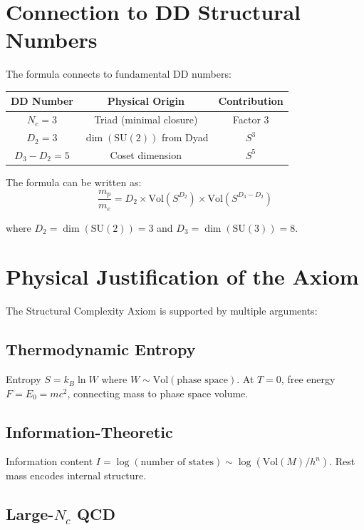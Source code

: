 \section{Connection to DD Structural Numbers}

The formula connects to fundamental DD numbers:

\begin{center}
\begin{tabular}{ccc}
\hline
DD Number & Physical Origin & Contribution \\
\hline
$N_c = 3$ & Triad (minimal closure) & Factor 3 \\
$D_2 = 3$ & $\dim(\text{SU}(2))$ from Dyad & $S^3$ \\
$D_3 - D_2 = 5$ & Coset dimension & $S^5$ \\
\hline
\end{tabular}
\end{center}

The formula can be written as:
\begin{equation}
\frac{m_p}{m_e} = D_2 \times \text{Vol}(S^{D_2}) \times \text{Vol}(S^{D_3 - D_2})
\end{equation}

where $D_2 = \dim(\text{SU}(2)) = 3$ and $D_3 = \dim(\text{SU}(3)) = 8$.

\section{Physical Justification of the Axiom}

The Structural Complexity Axiom is supported by multiple arguments:

\subsection{Thermodynamic Entropy}

Entropy $S = k_B \ln W$ where $W \sim \text{Vol}(\text{phase space})$. At $T = 0$, free energy $F = E_0 = mc^2$, connecting mass to phase space volume.

\subsection{Information-Theoretic}

Information content $I = \log(\text{number of states}) \sim \log(\text{Vol}(M)/h^n)$. Rest mass encodes internal structure.

\subsection{Large-$N_c$ QCD}

